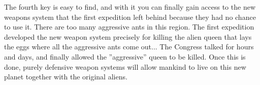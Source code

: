 The fourth key is easy to find, and with it you can finally gain access to the new weapons system that the first expedition left behind because they had no chance to use it. There are too many aggressive ants in this region. The first expedition developed the new weapon system precisely for killing the alien queen that lays the eggs where all the aggressive ants come out... The Congress talked for hours and days, and finally allowed the ''aggressive'' queen to be killed. Once this is done, purely defensive weapon systems will allow mankind to live on this new planet together with the original aliens.